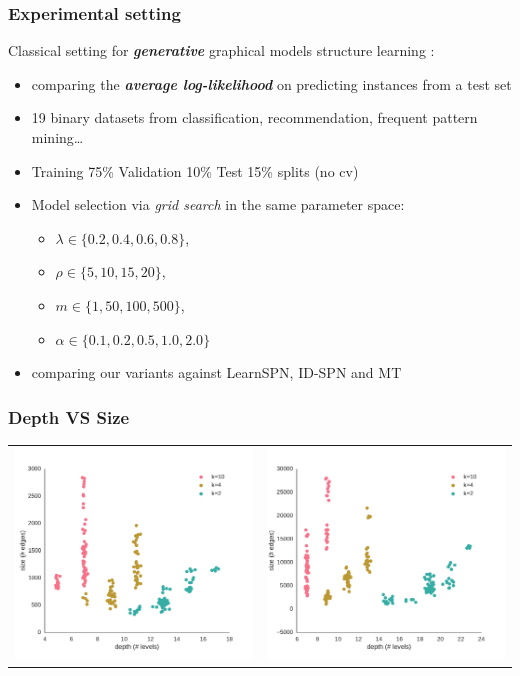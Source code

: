 \documentclass[xcolor={usenames,dvipsnames,svgnames}, compress]{beamer}
\begin{document}
\begin{frame}
  \frametitle{Experimental setting}
  \footnotesize
Classical setting for \emph{\textbf{generative}} graphical models
structure learning \parencite{Gens2013}:
  \begin{itemize}
    \itemsep 7pt
  \item comparing the \emph{\textbf{average log-likelihood}} on predicting instances from a test set
  \item 19 binary datasets from classification, recommendation,
    frequent pattern mining\dots \parencite{Lowd2010} \parencite{Haaren2012}
    \item Training 75\% Validation 10\% Test 15\%  splits (no cv)
  \item Model selection via \textit{grid search} in the same parameter space:
    \begin{itemize}
      \footnotesize
    \item $\lambda \in \{0.2, 0.4, 0.6, 0.8\}$,
    \item $\rho \in \{5, 10, 15, 20\}$, 
    \item $m \in \{1, 50, 100, 500\}$, 
    \item $\alpha \in \{ 0.1, 0.2, 0.5, 1.0, 2.0\}$
    \end{itemize}
  \item comparing our variants against \textsf{LearnSPN},
    \textsf{ID-SPN} and \textsf{MT}~\parencite{Meila2000}
  \end{itemize}

\end{frame}
\begin{frame}
  \frametitle{Depth VS Size}
  \begin{table}[ht]
    \centering
    \begin{tabular}{c c}
      \includegraphics[width=0.45\linewidth]{figures/nltcs-depth.pdf}&\includegraphics[width=0.45\linewidth]{figures/plants-depth.pdf}
    \end{tabular}
  \end{table}
\end{frame}
\end{document}
